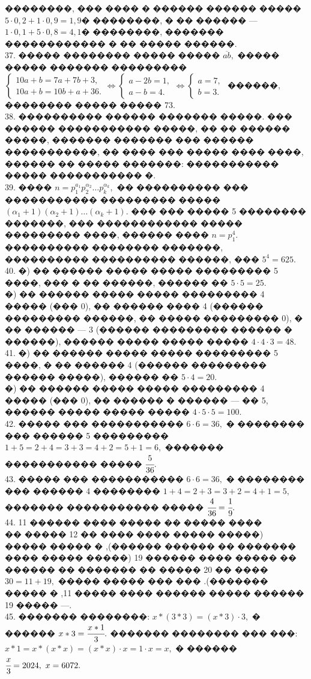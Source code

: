 \documentclass[12pt]{article}
\begin{document}
��������, ��� ���� � ������ ������ ����� $5\cdot0,2+1\cdot0,9=1,9$� ��������, � �� ������ --- $1\cdot0,1+5\cdot0,8=4,1$� ��������, ������� ������������ � �� ����� ������.\\
37. ����� �������� ����� ����� $\overline{ab},$ ����� ����� ������� ��������� $\begin{cases}10a+b=7a+7b+3,\\ 10a+b=10b+a+36.\end{cases}\Leftrightarrow
\begin{cases}a-2b=1,\\ a-b=4.\end{cases}\Leftrightarrow
\begin{cases}a=7,\\ b=3.\end{cases}$ ������, �������� ����� ����� 73.\\
38. ���������� ������ ������� �����. ��� ������ ����������� �����, �� �� ������ �����, ������� ������� ��� ������ �����������, �� ���� ��� ����� ���� ����, ������ �� ����� �������: ����������� ����� ����������� �.\\
39. ���� $n=p_1^{a_1}p_2^{\alpha_2}\ldots p_k^{\alpha_k},$ �� ���������� ��� ����������� ��������� ����� $(\alpha_1+1)(\alpha_2+1)\ldots (\alpha_k+1).$ ��� ��� ����� 5 �������� �������, ��� ������������ ����� ��������� ����, ������ ���� $n=p_1^4.$ ���������� �������� �������, ���������� ���������� ������, ��� $5^4=625.$\\
40. �) �� ������ ����� ����� ��������� 5 ����, ��� � �� ������, ������ �� $5\cdot5=25.$\\
�) �� ������ ����� ����� ��������� 4 ����� (��� 0), �� ������ ���� 4 (������ ��������� ������, �� ����� ��������� 0), � �� ������ --- 3 (������ ��������� ������ � ������), ������ ����� ����� ����� $4\cdot4\cdot3=48.$\\
41. �) �� ������ ����� ����� ��������� 5 ����, � �� ������ 4 (������ ��������� ������ �����), ������ �� $5\cdot4=20.$\\
�) �� ������ ����� ����� ��������� 4 ����� (��� 0), �� ������ � ������ --- �� 5, ������ ����� ����� ����� $4\cdot5\cdot5=100.$\\
42. ����� ��� ����������� $6\cdot6=36,$ � �������� ��� ������ 5 ��������� $1+5=2+4=3+3=4+2=5+1=6,$ ������� ����������� ����� $\cfrac{5}{36}.$\\
43. ����� ��� ����������� $6\cdot6=36,$ � �������� ��� ������ 4 �������� $1+4=2+3=3+2=4+1=5,$ ������� ����������� ����� $\cfrac{4}{36}=\cfrac{1}{9}.$\\
44. ׸���� ����� �� ����� ���� ������ 11 (����� ����� ���� ���� �� 12 ����� �� ������� �� ������ ������), � ����� ����� �� ����� ���� ������ 19 (����� ����� ���� ���� �� 20 ����� �� ������� �� ������ �������). ��� ��� ����� ����� $30=11+19,$ ������ ����� ������ ���� ����� 11, � ����� --- ����� 19.\\
45. ������� ��������: $x*(3*3)=(x*3)\cdot3,$ � ������ $x*3=\cfrac{x*1}{3}.$ ������� �������� ��� ���: $x*1=x*(x*x)=(x*x)\cdot x=1\cdot x=x,$ � ������
$\cfrac{x}{3}=2024,\ x=6072.$
\newpage
\end{document}
